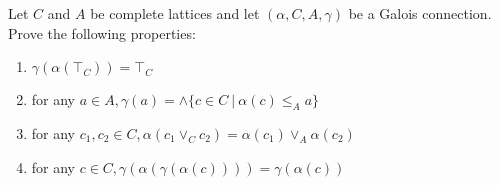 {Let $C$ and $A$ be complete lattices and let $(\alpha, C, A, \gamma)$ be a Galois connection. Prove the following properties:
\begin{enumerate}
	\item $\gamma(\alpha(\top_C)) = \top_C$
	\item for any $a \in A, \gamma(a) = \wedge \{c \in C\ |\ \alpha(c) \leq_A a \}$ 
	\item for any $c_1, c_2 \in C, \alpha(c_1 \vee_C c_2) = \alpha(c_1) \vee_A \alpha(c_2)$
	\item for any $c \in C, \gamma(\alpha(\gamma(\alpha(c)))) = \gamma(\alpha(c))$
\end{enumerate}	
}
{}